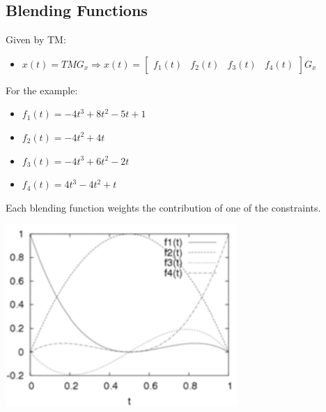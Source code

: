 \documentclass{article}
\begin{document}
\subsection*{Blending Functions}
Given by TM:
\begin{itemize}
    \item $x(t) = TMG_x \Rightarrow x(t) = \begin{bmatrix}f_1(t) & f_2(t) & f_3(t) & f_4(t)\end{bmatrix} G_x$
\end{itemize}
For the example:
\begin{itemize}
    \item $f_1(t) = -4t^3 + 8t^2 - 5t + 1$
    \item $f_2(t) = -4t^2 + 4t$
    \item $f_3(t) = -4t^3 + 6t^2 - 2t$
    \item $f_4(t) = 4t^3 - 4t^2 + t$
\end{itemize}
Each blending function weights the contribution of one of the constraints.
\begin{center}
    \includegraphics*[scale=1]{W3_6.png}
\end{center}
\end{document}

